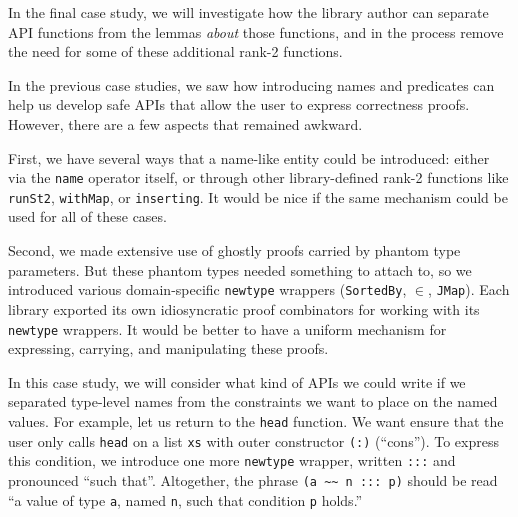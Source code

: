 \documentclass[format=sigplan, review=false, screen=true]{acmart}
\makeatletter
\let\origsection\section
\renewcommand\section{\@ifstar{\starsection}{\nostarsection}}
\newcommand\nostarsection[1]
{\sectionprelude\origsection{#1}\sectionpostlude}
\newcommand\starsection[1]
{\sectionprelude\origsection*{#1}\sectionpostlude}
\newcommand\sectionprelude{%
  \vspace{-0.5em}
}
\newcommand\sectionpostlude{%
  \vspace{0em}
}
\makeatother
\begin{document}
In the final case study, we will investigate how
the library author can separate API functions from the lemmas \emph{about} those
functions, and in the process remove the need for some of these additional
rank-2 functions.

\section{Case Study \#4: Arbitrary invariants}\label{full-gdp}

In the previous case studies, we saw how introducing names and predicates can
help us develop safe APIs that allow the user to express correctness proofs.
However, there are a few aspects that remained awkward.

First, we have several
ways that a name-like entity could be introduced: either via the \texttt{name} operator
itself, or through other library-defined rank-2 functions like \texttt{runSt2}, \texttt{withMap}, or \texttt{inserting}.
It would be nice if the same mechanism could be used for all of these cases.

Second, we made extensive use of ghostly proofs carried by phantom type parameters. But these
phantom types needed something to attach to, so we introduced various domain-specific \texttt{newtype}
wrappers (\texttt{SortedBy}, \texttt{$\in$},  \texttt{JMap}). Each library exported its own
idiosyncratic proof combinators for working with its \texttt{newtype} wrappers. It would be better to have
a uniform mechanism for expressing, carrying, and manipulating these proofs.

In this case study, we will consider what kind of APIs we could write if we separated
type-level names from the constraints we want to place on the named values.
For example, let us return to the \texttt{head} function. We want ensure that the
user only calls \texttt{head} on a list \texttt{xs} with outer constructor \texttt{(:)} (``cons'').
To express this condition, we introduce one more \texttt{newtype} wrapper,
written \texttt{:::} and pronounced ``such that''. Altogether, the phrase 
\verb|(a ~~ n ::: p)| should be read ``a value of type \texttt{a}, named \texttt{n}, such
that condition \texttt{p} holds.''
\end{document}
